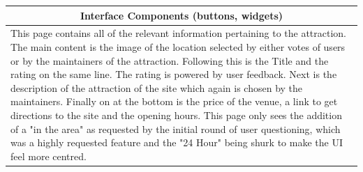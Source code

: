 \begin{tabular}{p{4cm}p{10cm}}
		\hline
		\multicolumn{2}{c}{Interface Components (buttons, widgets)} \\
		\hline
		\multicolumn{2}{p{14cm}}{This page contains all of the relevant information pertaining to the attraction. The main content is the image of the location selected by either votes of users or by the maintainers of the attraction. Following this is the Title and the rating on the same line. The rating is powered by user feedback. Next is the description of the attraction of the site which again is chosen by the maintainers. Finally on at the bottom is the price of the venue, a link to get directions to the site and the opening hours. This page only sees the addition of a "in the area" as requested by the initial round of user questioning, which was a highly requested feature and the "24 Hour" being shurk to make the UI feel more centred. } \\
		\hline
	\end{tabular}
